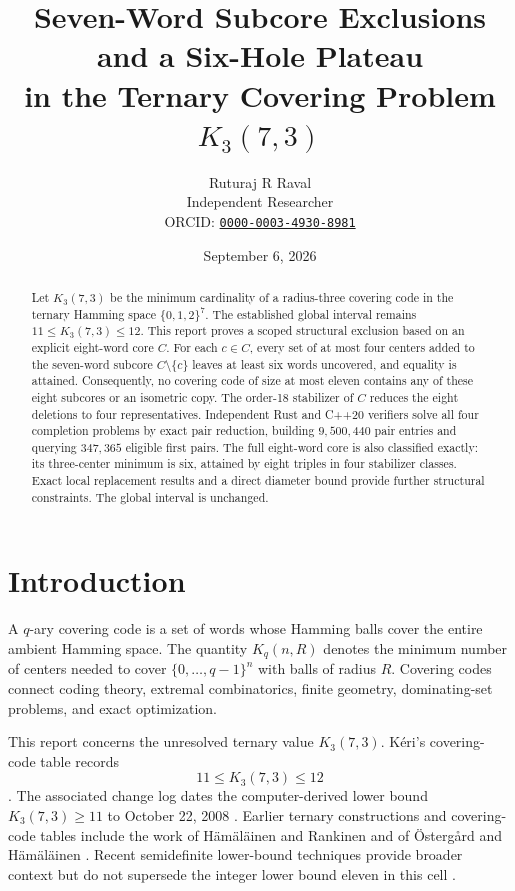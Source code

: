 \documentclass[11pt]{article}
\title{Seven-Word Subcore Exclusions and a Six-Hole Plateau\\
in the Ternary Covering Problem \(K_3(7,3)\)}
\author{%
  Ruturaj R Raval\\
  \small Independent Researcher\\
  \small ORCID:
  \href{https://orcid.org/0000-0003-4930-8981}
       {\texttt{0000-0003-4930-8981}}
}
\date{September 6, 2026}
\begin{document}
\maketitle

\begin{abstract}
Let \(K_3(7,3)\) be the minimum cardinality of a radius-three covering
code in the ternary Hamming space \(\{0,1,2\}^7\).  The established global
interval remains \(11 \leq K_3(7,3) \leq 12\).  This report proves a scoped
structural exclusion based on an explicit eight-word core \(C\).  For each
\(c\in C\), every set of at most four centers added to the seven-word
subcore \(C\setminus\{c\}\) leaves at least six words uncovered, and
equality is attained.  Consequently, no covering code of size at most
eleven contains any of these eight subcores or an isometric copy.  The
order-18 stabilizer of \(C\) reduces the eight deletions to four
representatives.  Independent Rust and C++20 verifiers solve all four
completion problems by exact pair reduction, building \(9{,}500{,}440\)
pair entries and querying \(347{,}365\) eligible first pairs.  The full
eight-word core is also classified exactly: its three-center minimum is
six, attained by eight triples in four stabilizer classes.  Exact local
replacement results and a direct diameter bound provide further structural
constraints.  The global interval is unchanged.
\end{abstract}

\section{Introduction}

A \(q\)-ary covering code is a set of words whose Hamming balls cover the
entire ambient Hamming space.  The quantity \(K_q(n,R)\) denotes the
minimum number of centers needed to cover \(\{0,\ldots,q-1\}^n\) with
balls of radius \(R\).  Covering codes connect coding theory, extremal
combinatorics, finite geometry, dominating-set problems, and exact
optimization.

This report concerns the unresolved ternary value \(K_3(7,3)\).  K\'eri's
covering-code table records
\[
  11 \leq K_3(7,3) \leq 12
\]
\cite{keri-table}.  The associated change log dates the computer-derived
lower bound \(K_3(7,3)\geq 11\) to October 22, 2008
\cite{keri-log}.  Earlier ternary constructions and covering-code tables
include the work of H\"am\"al\"ainen and Rankinen
\cite{hamalainen-rankinen-1991} and of
\"Osterg{\aa}rd and H\"am\"al\"ainen
\cite{ostergard-hamalainen-1997}.  Recent semidefinite lower-bound
techniques provide broader context but do not supersede the integer lower
bound eleven in this cell \cite{gijswijt-polak-2026}.
\end{document}
